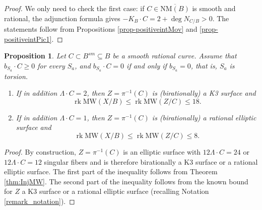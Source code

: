 \documentclass[11pt]{amsart}
\newtheorem{proposition}[theorem]{Proposition}
\theoremstyle{definition}
\theoremstyle{definition}
\theoremstyle{remark}
\theoremstyle{remark}
\theoremstyle{definition}
\theoremstyle{conjecture}
\newcommand{\MW}{\mathrm{MW}}
\begin{document}
\begin{proof} We only need to check the first case: if $C \in \overline{\mathrm{NM}(B)}$ is smooth and rational, the adjunction formula  gives $-K_B \cdot C = 2+ \deg N_{C/B} > 0$.  The statements follow from Propositions \ref{prop-positiveintMov} and \ref{prop-positiveintPic1}.
 \end{proof}

\begin{proposition} \label{prop:K3appearance1}Let $C \subset B^{sm} \subseteq B $ be a smooth rational curve. Assume that
$b_{S_a} \cdot C \geq 0$ for every $S_a$, and
$b_{S_a} \cdot C = 0$ if and only if $b_{S_a}=0$, that is, $S_a$ is torsion. 
\begin{enumerate}
    \item  If in addition $\Lambda \cdot C=2$, then $Z=\pi^{-1}(C)$ is  (birationally) a K3 surface and
\begin{equation*} 
    \operatorname{rk} \MW(X/B) \leq \operatorname{rk} \MW(Z/C)   \leq 18.
    \end{equation*}
    \item  If in addition $\Lambda \cdot C=1$, then $Z=\pi^{-1}(C)$ is  (birationally) a rational elliptic surface and
\begin{equation*} \label{eq:rank18bound}
    \operatorname{rk} \MW(X/B) \leq \operatorname{rk} \MW(Z/C)   \leq 8.
    \end{equation*}
\color{black}
\end{enumerate}

    \end{proposition}
\begin{proof} 
By construction, $Z=\pi^{-1}(C)$ is an elliptic surface with  $ 12 \Lambda \cdot C =24$  or $ 12 \Lambda \cdot C =12 $ singular fibers and  is therefore birationally a K3 surface or a rational elliptic surface. 
 The first part of the inequality 
 follows from Theorem \ref{thm:InjMW}.
   The second part of the inequality  follows from the known bound
for $Z$ a K3 surface or a rational elliptic surface (recalling Notation \ref{remark_notation}).
\end{proof}
\end{document}
